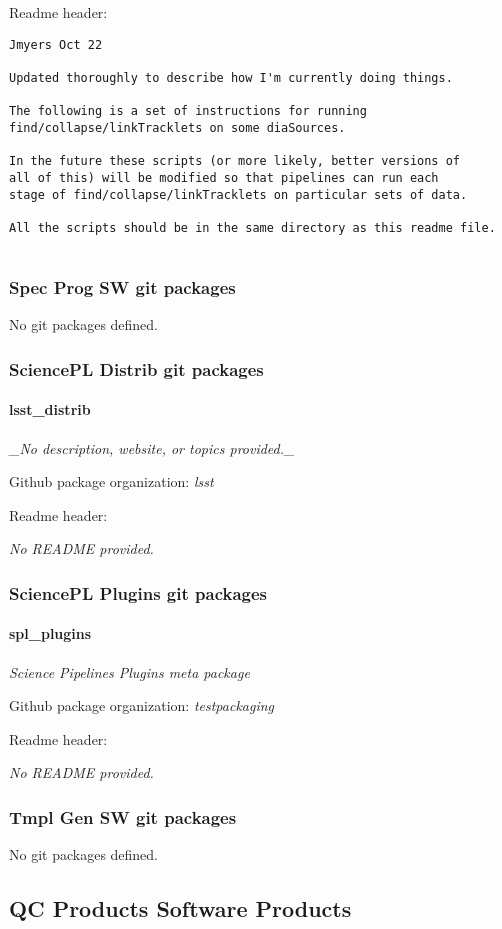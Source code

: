 Readme header:

\begin{verbatim}
Jmyers Oct 22

Updated thoroughly to describe how I'm currently doing things.

The following is a set of instructions for running
find/collapse/linkTracklets on some diaSources. 

In the future these scripts (or more likely, better versions of
all of this) will be modified so that pipelines can run each
stage of find/collapse/linkTracklets on particular sets of data.

All the scripts should be in the same directory as this readme file.


\end{verbatim}

\subsubsection{Spec Prog SW git packages}
No git packages defined.\subsubsection{SciencePL Distrib git packages}
\paragraph{lsst\_distrib}
\textit{\_No description, website, or topics provided.\_}

Github package organization: \textit{lsst}

Readme header:

\textit{No README provided.}

\subsubsection{SciencePL Plugins git packages}
\paragraph{spl\_plugins}
\textit{Science Pipelines Plugins meta package}

Github package organization: \textit{testpackaging}

Readme header:

\textit{No README provided.}

\subsubsection{Tmpl Gen SW git packages}
No git packages defined.\subsection{QC Products Software Products}
